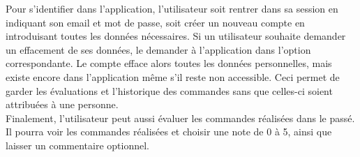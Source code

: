 \documentclass[10pt, a4paper]{article}
\begin{document}
Pour s'identifier dans l'application, l'utilisateur soit rentrer dans sa session en indiquant son email et mot de passe, soit créer un nouveau compte en introduisant toutes les données nécessaires. Si un utilisateur souhaite demander un effacement de ses données, le demander à l'application dans l'option correspondante. Le compte efface alors toutes les données personnelles, mais existe encore dans l'application même s'il reste non accessible. Ceci permet de garder les évaluations et l'historique des commandes sans que celles-ci soient attribuées à une personne. \\

Finalement, l'utilisateur peut aussi évaluer les commandes réalisées dans le passé. Il pourra voir les commandes réalisées et choisir une note de 0 à 5, ainsi que laisser un commentaire optionnel.
\end{document}
